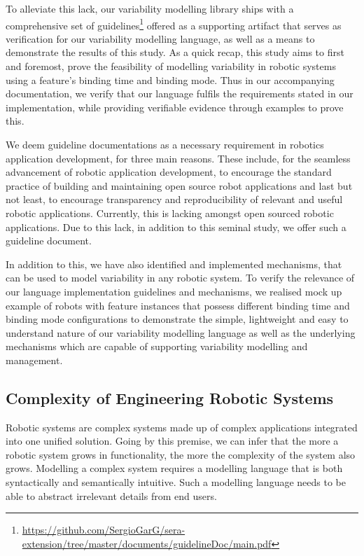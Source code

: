 \documentclass[conference]{IEEEtran}
\newcommand{\foot}[1]{\footnote{\url{#1}}}
\begin{document}
To alleviate this lack, our variability modelling library ships with a comprehensive set of guidelines\foot{https://github.com/SergioGarG/sera-extension/tree/master/documents/guidelineDoc/main.pdf}
offered as a supporting artifact that serves as verification for our variability modelling language, as well as a means to demonstrate the results of this study. As a quick recap, this study aims to first and foremost, prove the feasibility of modelling variability in robotic systems using a feature's binding time and binding mode.  Thus in our accompanying documentation, we verify that our language fulfils the requirements stated in our implementation, while providing verifiable evidence through examples to prove this.

We deem guideline documentations as a necessary requirement in robotics application development, for three main reasons. These include, for the seamless advancement of robotic application development, to encourage the standard practice of building and maintaining open source robot applications and last but not least, to encourage transparency and reproducibility of relevant and useful robotic applications. Currently, this is lacking amongst open sourced robotic applications. Due to this lack, in addition to this seminal study, we offer such a guideline document.

In addition to this, we have also identified and implemented mechanisms, that can be used to model variability in any robotic system. To verify the relevance of our language implementation guidelines and mechanisms, we realised mock up example of robots with feature instances that possess different binding time and binding mode configurations to demonstrate the simple, lightweight and easy to understand nature of our variability modelling language as well as the underlying mechanisms which are capable of supporting variability modelling and management.

\subsection{Complexity of Engineering Robotic Systems}
Robotic systems are complex systems made up of complex applications integrated into one unified solution. Going by this premise, we can infer that the more a robotic system grows in functionality, the more the complexity of the system also grows. Modelling a complex system requires a modelling language that is both syntactically and semantically intuitive. Such a modelling language needs to be able to abstract irrelevant details from end users.
\end{document}

